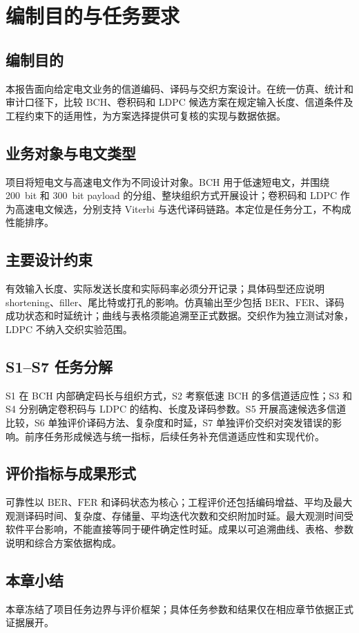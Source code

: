 \chapter{编制目的与任务要求}\label{chap:purpose}
\section{编制目的}
本报告面向给定电文业务的信道编码、译码与交织方案设计。在统一仿真、统计和审计口径下，比较 BCH、卷积码和 LDPC 候选方案在规定输入长度、信道条件及工程约束下的适用性，为方案选择提供可复核的实现与数据依据。
\section{业务对象与电文类型}
项目将短电文与高速电文作为不同设计对象。BCH 用于低速短电文，并围绕 \SI{200}{bit} 和 \SI{300}{bit} payload 的分组、整块组织方式开展设计；卷积码和 LDPC 作为高速电文候选，分别支持 Viterbi 与迭代译码链路。本定位是任务分工，不构成性能排序。
\section{主要设计约束}
有效输入长度、实际发送长度和实际码率必须分开记录；具体码型还应说明 shortening、filler、尾比特或打孔的影响。仿真输出至少包括 \(\mathrm{BER}\)、\(\mathrm{FER}\)、译码成功状态和时延统计；曲线与表格须能追溯至正式数据。交织作为独立测试对象，LDPC 不纳入交织实验范围。
\section{S1--S7 任务分解}
S1 在 BCH 内部确定码长与组织方式，S2 考察低速 BCH 的多信道适应性；S3 和 S4 分别确定卷积码与 LDPC 的结构、长度及译码参数。S5 开展高速候选多信道比较，S6 单独评价译码方法、复杂度和时延，S7 单独评价交织对突发错误的影响。前序任务形成候选与统一指标，后续任务补充信道适应性和实现代价。
\section{评价指标与成果形式}
可靠性以 \(\mathrm{BER}\)、\(\mathrm{FER}\) 和译码状态为核心；工程评价还包括编码增益、平均及最大观测译码时间、复杂度、存储量、平均迭代次数和交织附加时延。最大观测时间受软件平台影响，不能直接等同于硬件确定性时延。成果以可追溯曲线、表格、参数说明和综合方案依据构成。
\section{本章小结}
本章冻结了项目任务边界与评价框架；具体任务参数和结果仅在相应章节依据正式证据展开。
